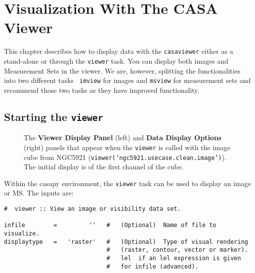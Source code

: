 

\chapter{Visualization With The CASA Viewer}
\label{chapter:display}

This chapter describes how to display data with the {\tt casaviewer}
either as a stand-alone or through the {\tt viewer} task. You can
display both images and Measurement Sets in the viewer. We are,
however, splitting the functionalities into two different tasks {\tt
  imview} for images and {\tt msview} for measurement sets and
recommend those two tasks as they have improved functionality. 

\section{Starting the {\tt viewer}}
\label{section:display.start}

\begin{figure}[h!]
\begin{center}
\caption{\label{fig:viewer_start} The {\bf Viewer Display Panel} (left) and 
{\bf Data Display Options} (right) panels that appear when the 
{\tt viewer} is called with the image cube from NGC5921
({\tt viewer('ngc5921.usecase.clean.image')}).  The initial display is
of the first channel of the cube.}
\hrulefill
\end{center}
\end{figure}

Within the casapy environment, the {\tt viewer} task
can be used to display an image or MS.  The inputs are:
\small
\begin{verbatim}
#  viewer :: View an image or visibility data set.

infile        =         ''   #   (Optional)  Name of file to visualize.
displaytype   =   'raster'   #   (Optional)  Type of visual rendering
                             #   (raster, contour, vector or marker).
                             #   lel  if an lel expression is given
                             #   for infile (advanced).

\end{verbatim}
\normalsize

